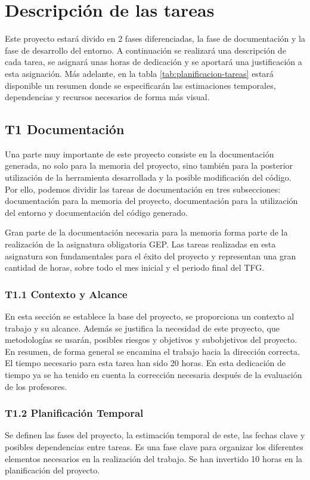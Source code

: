\chapter{Descripción de las tareas}
Este proyecto estará divido en 2 fases diferenciadas, la fase de documentación y la fase de desarrollo del entorno. A continuación se realizará una descripción de cada tarea, se asignará unas horas de dedicación y se aportará una justificación a esta asignación. Más adelante, en la tabla \ref{tab:planificacion-tareas} estará disponible un resumen donde se especificarán las estimaciones temporales, dependencias y recursos necesarios de forma más visual.

\section{T1 Documentación}
Una parte muy importante de este proyecto consiste en la documentación generada, no solo para la memoria del proyecto, sino también para la posterior utilización de la herramienta desarrollada y la posible modificación del código. Por ello, podemos dividir las tareas de documentación en tres subsecciones: documentación para la memoria del proyecto, documentación para la utilización del entorno y documentación del código generado.

Gran parte de la documentación necesaria para la memoria forma parte de la realización de la asignatura obligatoria GEP. Las tareas realizadas en esta asignatura son fundamentales para el éxito del proyecto y representan una gran cantidad de horas, sobre todo el mes inicial y el periodo final del TFG.

\subsection*{T1.1 Contexto y Alcance}
En esta sección se establece la base del proyecto, se proporciona un contexto al trabajo y su alcance. Además se justifica la necesidad de este proyecto, que metodologías se usarán, posibles riesgos y objetivos y subobjetivos del proyecto. En resumen, de forma general se encamina el trabajo hacia la dirección correcta. El tiempo necesario para esta tarea han sido 20 horas. En esta dedicación de tiempo ya se ha tenido en cuenta la corrección necesaria después de la evaluación de los profesores.

\subsection*{T1.2 Planificación Temporal}
Se definen las fases del proyecto, la estimación temporal de este, las fechas clave y posibles dependencias entre tareas. Es una fase clave para organizar los diferentes elementos necesarios en la realización del trabajo. Se han invertido 10 horas en la planificación del proyecto.

